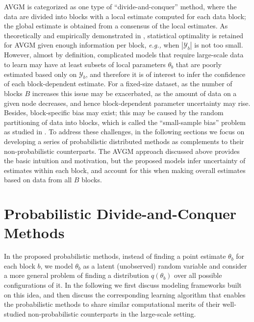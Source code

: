 \documentclass{article}
\newcommand{\eg}[0]{\emph{e.g., }}
\newcommand{\1}[0]{\ensuremath{\boldsymbol{1}}\xspace}
\begin{document}
AVGM is categorized as one type of ``divide-and-conquer'' method, where the data are divided into blocks with a local estimate computed for each data block; the global estimate is obtained from a consensus of the local estimates. As theoretically and empirically demonstrated in \cite{YZhang2012}, statistical optimality is retained for AVGM given enough information per block, \eg when $|\mathcal{Y}_b|$ is not too small. However, almost by definition, complicated models that require large-scale data to learn may have at least subsets of local parameters $\theta_b$ that are poorly estimated based only on $\mathcal{Y}_b$, and therefore it is of interest to infer the confidence of each block-dependent estimate. For a fixed-size dataset, as the number of blocks $B$ increases this issue may be exacerbated, as the amount of data on a given node decreases, and hence block-dependent parameter uncertainty may rise. Besides, block-specific bias may exist; this may be caused by the random partitioning of data into blocks, which is called the ``small-sample bias'' problem as studied in \cite{YZhang2012, Scott2013}. To address these challenges, in the following sections we focus on developing a series of probabilistic distributed methods as complements to their non-probabilistic counterparts. The AVGM approach discussed above provides the basic intuition and motivation, but the proposed models infer uncertainty of estimates within each block, and account for this when making overall estimates based on data from all $B$ blocks.


\section{Probabilistic Divide-and-Conquer Methods}\label{proposed_frameworks}


In the proposed probabilistic methods, instead of finding a point estimate $\theta_b$ for each block $b$, we model $\theta_b$ as a latent (unobserved) random variable and consider a more general problem of finding a distribution $q(\theta_b)$ over all possible configurations of it. In the following we first discuss modeling frameworks built on this idea, and then discuss the corresponding learning algorithm that enables the probabilistic methods to share similar computational merits of their well-studied non-probabilistic counterparts in the large-scale setting.
\end{document}
